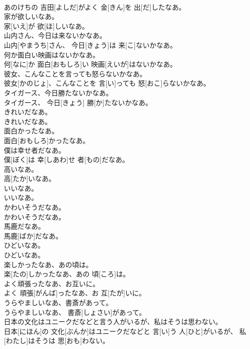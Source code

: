 \documentclass[8pt]{extreport}
\begin{document}
\begin{CJK}{UTF8}{min}
\\	あのけちの 吉田[よしだ]がよく 金[きん]を 出[だ]したなあ。
\\	家が欲しいなあ。	
\\	家[いえ]が 欲[ほ]しいなあ。
\\	山内さん、今日は来ないかなあ。	
\\	山内[やまうち]さん、 今日[きょう]は 来[こ]ないかなあ。
\\	何か面白い映画はないかなあ。	
\\	何[なに]か 面白[おもしろ]い 映画[えいが]はないかなあ。
\\	彼女、こんなことを言っても怒らないかなあ。	
\\	彼女[かのじょ]、こんなことを 言[い]っても 怒[おこ]らないかなあ。
\\	タイガース、今日勝たないかなあ。	
\\	タイガース、 今日[きょう] 勝[か]たないかなあ。
\\	きれいだなあ。	
\\	きれいだなあ。
\\	面白かったなあ。	
\\	面白[おもしろ]かったなあ。
\\	僕は幸せ者だなあ。	
\\	僕[ぼく]は 幸[しあわ]せ 者[もの]だなあ。
\\	高いなあ。	
\\	高[たか]いなあ。
\\	いいなあ。	
\\	いいなあ。
\\	かわいそうだなあ。	
\\	かわいそうだなあ。
\\	馬鹿だなあ。	
\\	馬鹿[ばか]だなあ。
\\	ひどいなあ。	
\\	ひどいなあ。
\\	楽しかったなあ、あの頃は。	
\\	楽[たの]しかったなあ、あの 頃[ころ]は。
\\	よく頑張ったなあ、お互いに。	
\\	よく 頑張[がんば]ったなあ、お 互[たが]いに。
\\	うらやましいなあ、書斎があって。	
\\	うらやましいなあ、 書斎[しょさい]があって。
\\	日本の文化はユニークだなどと言う人がいるが、私はそうは思わない。	
\\	日本[にほん]の 文化[ぶんか]はユニークだなどと 言[い]う 人[ひと]がいるが、 私[わたし]はそうは 思[おも]わない。

\end{CJK}
\end{document}
